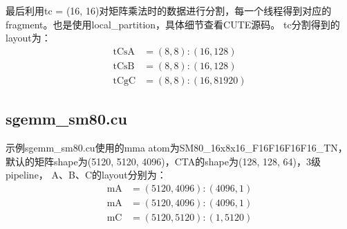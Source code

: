 \documentclass[a4paper,12pt]{ctexart}
\numberwithin{equation}{section}
\begin{document}
最后利用tc = (16, 16)对矩阵乘法时的数据进行分割，每一个线程得到对应的fragment。也是使用local_partition，具体细节查看CUTE源码。
tc分割得到的layout为：
\begin{equation}
  \begin{aligned}
    \mathrm{tCsA} & =(8,8):(16,128)   \\
    \mathrm{tCsB} & =(8,8):(16,128)   \\
    \mathrm{tCgC} & =(8,8):(16,81920)
  \end{aligned}
\end{equation}

\subsection{sgemm_sm80.cu}
示例sgemm_sm80.cu使用的mma atom为SM80_16x8x16_F16F16F16F16_TN，默认的矩阵shape为(5120, 5120, 4096)，CTA的shape为(128, 128, 64)，3级pipeline，
A、B、C的layout分别为：
\begin{equation}
  \begin{aligned}
    \mathrm{mA} & =(5120,4096):(4096,1)  \\
    \mathrm{mA} & =(5120,4096):(4096,1)  \\
    \mathrm{mC} & =(5120,5120):(1, 5120)
  \end{aligned}
\end{equation}

\printbibliography[title={参考文献}]
\end{document}
